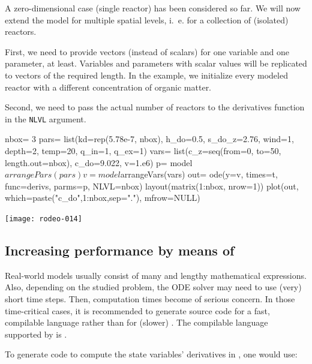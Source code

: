 \documentclass[times,onecolumn]{article}
\begin{document}
A zero-dimensional case (single reactor) has been considered so far. We will now extend the model for multiple spatial levels, i.~e. for a collection of (isolated) reactors.

First, we need to provide vectors (instead of scalars) for one variable and one parameter, at least. Variables and parameters with scalar values will be replicated to vectors of the required length. In the example, we initialize every modeled reactor with a different concentration of organic matter.

Second, we need to pass the actual number of reactors to the derivatives function in the \verb!NLVL! argument.

\begin{Schunk}
\begin{Sinput}
 nbox= 3
 pars= list(kd=rep(5.78e-7, nbox), h_do=0.5, s_do_z=2.76, wind=1,
   depth=2, temp=20, q_in=1, q_ex=1)
 vars= list(c_z=seq(from=0, to=50, length.out=nbox), c_do=9.022,
   v=1.e6)
 p= model$arrangePars(pars)
 v= model$arrangeVars(vars)
 out= ode(y=v, times=t, func=derivs, parms=p, NLVL=nbox)
 layout(matrix(1:nbox, nrow=1))
 plot(out, which=paste("c_do",1:nbox,sep="."), mfrow=NULL)
\end{Sinput}
\end{Schunk}
\texttt{[image: rodeo-014]}


\subsection{Increasing performance by means of } \label{sec:advanced:fortran}

Real-world models usually consist of many and lengthy mathematical expressions. Also, depending on the studied problem, the ODE solver may need to use (very) short time steps. Then, computation times become of serious concern. In those time-critical cases, it is recommended to generate source code for a fast, compilable language rather than for (slower) . The compilable language supported by  is .

To generate code to compute the state variables' derivatives in , one would use:

\begin{Schunk}
\end{Schunk}
\end{document}
